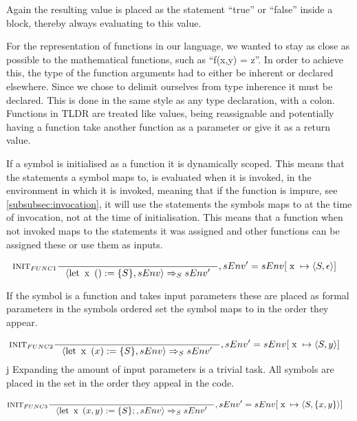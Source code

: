 Again the resulting value is placed as the statement \enquote{true} or \enquote{false} inside a block, thereby always evaluating to this value.

For the representation of functions in our language, we wanted to stay as close as possible to the mathematical functions, such as \enquote{f(x,y) = z}. In order to achieve this, the type of the function arguments had to either be inherent or declared elsewhere. Since we chose to delimit ourselves from type inherence it must be declared. This is done in the same style as any type declaration, with a colon. Functions in TLDR are treated like values, being reassignable and potentially having a function take another function as a parameter or give it as a return value.

If a symbol is initialised as a function it is dynamically scoped. This means that the statements a symbol maps to, is evaluated when it is invoked, in the environment in which it is invoked, meaning that if the function is impure, see \cref{subsubsec:invocation}, it will use the statements the symbols maps to at the time of invocation, not at the time of initialisation. This means that a function when not invoked maps to the statements it was assigned and other functions can be assigned these or use them as inputs.

\begin{align*}
&\inference[$\text{INIT}_{FUNC1}$]{}
                         {\Braket{\Tlet \Tx() := \{S\},sEnv} \Rightarrow_S sEnv'}
												 {, sEnv' = sEnv[\Tx \mapsto \Braket{S,\epsilon}]}
\end{align*}

If the symbol is a function and takes input parameters these are placed as formal parameters in the symbols ordered set the symbol maps to in the order they appear.

\begin{align*}
&\inference[$\text{INIT}_{FUNC2}$]{}
                         {\Braket{\Tlet \Tx(x) := \{S\},sEnv} \Rightarrow_S sEnv'}
												 {, sEnv' = sEnv[\Tx \mapsto \Braket{S,y}]}
\end{align*}
j
Expanding the amount of input parameters is a trivial task. All symbols are placed in the set in the order they appeal in the code. 

\begin{align*}
&\inference[$\text{INIT}_{FUNC3}$]{}
                         {\Braket{\Tlet \Tx(x,y) := \{S\};,sEnv} \Rightarrow_S sEnv'}
												 {, sEnv' = sEnv[\Tx \mapsto \Braket{S,\{x,y\}}]}
\end{align*}

